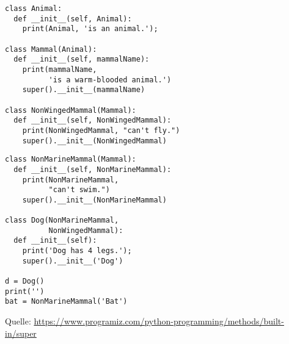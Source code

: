 \begin{frame}[fragile]
%
\begin{tcbraster}[raster columns=2,
                  raster equal height,
                  nobeforeafter,
                  raster column skip=0.5cm]
\begin{codebox}
\begin{verbatim}
class Animal:
  def __init__(self, Animal):
    print(Animal, 'is an animal.');
    
class Mammal(Animal):
  def __init__(self, mammalName):
    print(mammalName, 
          'is a warm-blooded animal.')
    super().__init__(mammalName)

class NonWingedMammal(Mammal):
  def __init__(self, NonWingedMammal):
    print(NonWingedMammal, "can't fly.")
    super().__init__(NonWingedMammal)
\end{verbatim}
\end{codebox}
%
\begin{codebox}[... Fortsetzung]
\begin{verbatim}
class NonMarineMammal(Mammal):
  def __init__(self, NonMarineMammal):
    print(NonMarineMammal, 
          "can't swim.")
    super().__init__(NonMarineMammal)
    
class Dog(NonMarineMammal,
          NonWingedMammal):
  def __init__(self):
    print('Dog has 4 legs.');
    super().__init__('Dog')

d = Dog()
print('')
bat = NonMarineMammal('Bat')
\end{verbatim}
\end{codebox}
\end{tcbraster}
%
\begin{center}
	\scriptsize
	Quelle:
	\url{https://www.programiz.com/python-programming/methods/built-in/super}
\end{center}
%
\end{frame}


